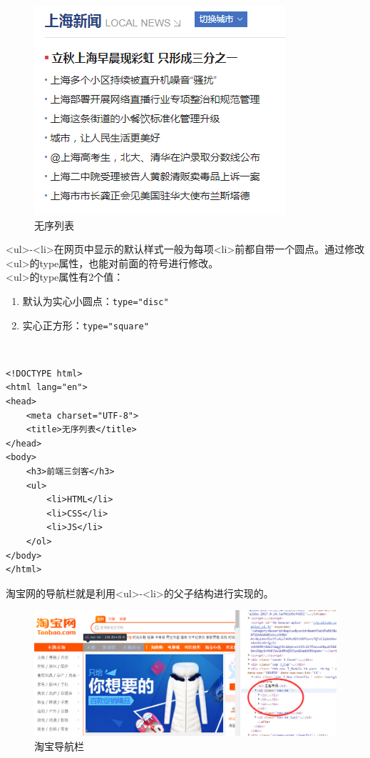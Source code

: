 \begin{figure}[H]
	\centering
	\includegraphics[scale=0.8]{img/C3/3-2/1.png}
	\caption{无序列表}
\end{figure}

<ul>-<li>在网页中显示的默认样式一般为每项<li>前都自带一个圆点。通过修改<ul>的type属性，也能对前面的符号进行修改。 \\

<ul>的type属性有2个值：

\begin{enumerate}
	\item 默认为实心小圆点：\lstinline|type="disc"|
	\item 实心正方形：\lstinline|type="square"|
\end{enumerate}

 \\

\begin{lstlisting}[style=htmlcssjs]
<!DOCTYPE html>
<html lang="en">
<head>
    <meta charset="UTF-8">
    <title>无序列表</title>
</head>
<body>
    <h3>前端三剑客</h3>
    <ul>
        <li>HTML</li>
        <li>CSS</li>
        <li>JS</li>
    </ol>
</body>
</html>
\end{lstlisting}

淘宝网的导航栏就是利用<ul>-<li>的父子结构进行实现的。

\begin{figure}[H]
	\centering
	\includegraphics[scale=0.5]{img/C3/3-2/2.png}
	\caption{淘宝导航栏}
\end{figure}

